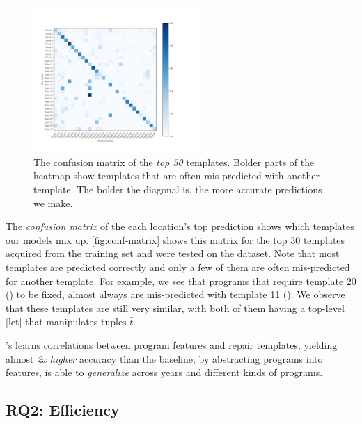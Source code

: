 \begin{figure}[t]
  \centering
  \includegraphics[trim={30 40 100 70},clip,height=2.2in]{evaluation-conf-matrix-no-title.pdf}
  \caption{The confusion matrix of the \emph{top 30} templates. Bolder parts of
  the heatmap show templates that are often mis-predicted with another template.
  The bolder the diagonal is, the more accurate predictions we make.}
  \label{fig:conf-matrix}
\end{figure}

%
The \emph{confusion matrix} of the each location's top prediction shows which
templates our models mix up.
%
\autoref{fig:conf-matrix} shows this matrix for the top 30 templates acquired
from the \SPRING training set and were tested on the \FALL dataset.
%
Note that most templates are predicted correctly and only a few of them are
often mis-predicted for another template.
%
For example, we see that programs that require template 20
() to be fixed,
almost always are mis-predicted with template 11 (). We observe that these templates are still very
similar, with both of them having a top-level |let| that manipulates tuples
$\hat{t}$.

\begin{framed}
  \noindent \toolname's learns correlations between program features and repair
  templates, yielding almost \emph{2x higher} accuracy than the baseline; by
  abstracting programs into features, \toolname is able to \emph{generalize}
  across years and different kinds of programs.
\end{framed}


\subsection{RQ2: Efficiency}
\label{sec:eval:efficiency}
\label{subsec:eval:man_rep_qual_eval}


